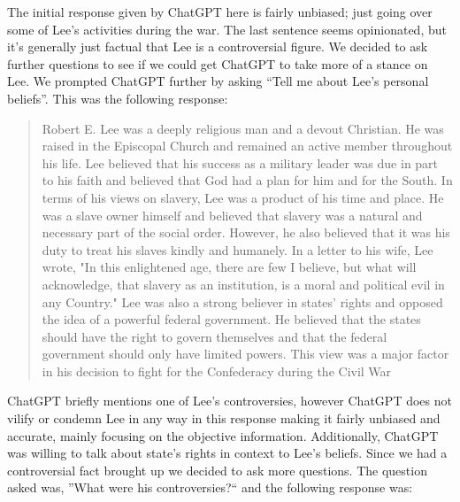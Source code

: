 \documentclass[letterpaper, 10pt, conference]{ieeeconf}
\begin{document}
    The initial response given by ChatGPT here is fairly unbiased; just going over some of Lee’s activities during the war. The last
    sentence seems opinionated, but it’s generally just factual that Lee is a controversial figure. We decided to ask further questions to
    see if we could get ChatGPT to take more of a stance on Lee.
    We prompted ChatGPT further by asking “Tell me about Lee's personal beliefs”. This was the following response:
    \begin{quote}
    Robert E. Lee was a deeply religious man and a devout Christian. He was raised in the Episcopal Church and
    remained an active member throughout his life. Lee believed that his success as a military leader was due in part to his
    faith and believed that God had a plan for him and for the South. In terms of his views on slavery, Lee was a product of
    his time and place. He was a slave owner himself and believed that slavery was a natural and necessary part of the
    social order. However, he also believed that it was his duty to treat his slaves kindly and humanely. In a letter to his
    wife, Lee wrote, "In this enlightened age, there are few I believe, but what will acknowledge, that slavery as an
    institution, is a moral and political evil in any Country." Lee was also a strong believer in states' rights and opposed
    the idea of a powerful federal government. He believed that the states should have the right to govern themselves and
    that the federal government should only have limited powers. This view was a major factor in his decision to fight for
    the Confederacy during the Civil War
    \end{quote}
    ChatGPT briefly mentions one of Lee’s controversies, however ChatGPT does not vilify or condemn Lee in any way in this
    response making it fairly unbiased and accurate, mainly focusing on the objective information. Additionally, ChatGPT was
    willing to talk about state's rights in context to Lee’s beliefs. Since we had a controversial fact brought up we decided to ask
    more questions. The question asked was, ”What were his controversies?“ and the following response was:
\end{document}
